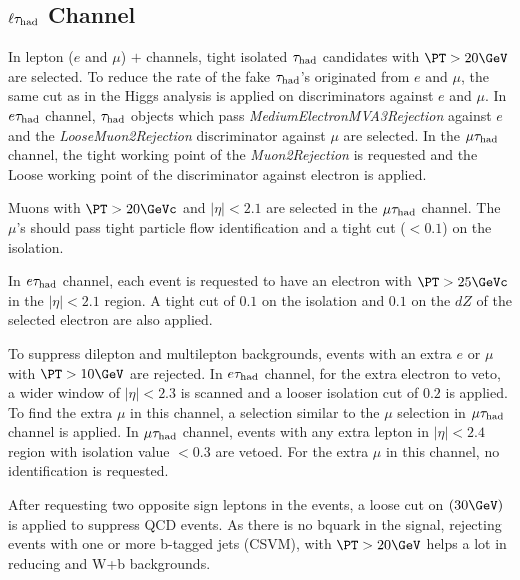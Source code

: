 \subsection{\texorpdfstring{$\ell\tau_{\rm had}$ Channel}{lepton-tau Channel}}
\label{sect:leptonTauCuts}
In lepton ($e$ and $\mu$) $+$ \Tau channels, tight isolated $\tau_{\rm had}$ candidates with $\PT > 20 \GeV$  are selected. To reduce the rate of the fake $\tau_{\rm had}$'s originated from $e$ and $\mu$, the same cut as in the Higgs analysis \cite{CMS_AN_2013-188} is applied on discriminators against $e$ and $\mu$. In $e\tau_{\rm had}$ channel, $\tau_{\rm had}$ objects which pass \emph{MediumElectronMVA3Rejection} against $e$ and the \emph{LooseMuon2Rejection} discriminator against $\mu$ are selected. In the $\mu\tau_{\rm had}$ channel, the tight working point of the \emph{Muon2Rejection} is requested and the Loose working point of the discriminator against electron is applied.

Muons with $\PT > 20 \GeVc$ and $|\eta|<2.1$ are selected in the $\mu\tau_{\rm had}$ channel. The $\mu$'s should pass tight particle flow identification and a tight cut ($<0.1$) on the isolation.
 
In $e\tau_{\rm had}$ channel, each event is requested to have an electron with $\PT >25 \GeVc$ in the $|\eta| < 2.1 $ region. A tight cut of $0.1$ on the isolation and $0.1$ on the $dZ$ of the selected electron are also applied.

To suppress dilepton and multilepton backgrounds, events with an extra $e$ or $\mu$ with $\PT >10 \GeV$ are rejected. In $e\tau_{\rm had}$ channel, for the extra electron to veto, a wider window of $|\eta|<2.3$ is scanned and a looser isolation cut of $0.2$ is applied. To find the extra $\mu$ in this channel, a selection similar to the $\mu$ selection in $\mu\tau_{\rm had}$ channel is applied. In $\mu\tau_{\rm had}$ channel, events with any extra lepton in $|\eta|<2.4$ region with isolation value $<0.3$ are vetoed. For the extra $\mu$ in this channel, no identification is requested.


After requesting two opposite sign leptons in the events, a loose cut on \MET $(30 \GeV)$ is applied to suppress QCD events. As there is no bquark in the signal, rejecting events with one or more b-tagged jets (CSVM), with $\PT > 20 \GeV$ helps a lot in reducing \ttbar and W+b backgrounds.

